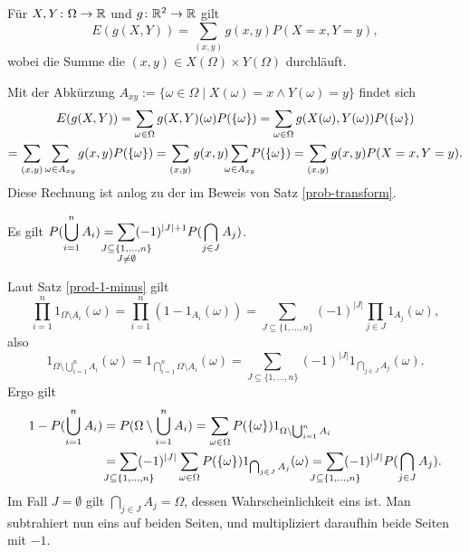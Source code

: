 \begin{Satz}
Für $X,Y\colon\Omega\to\mathbb R$ und $g\colon\mathbb R^2\to\mathbb R$ gilt
\[E(g(X,Y)) = \sum_{(x,y)} g(x,y)P(X=x,Y=y),\]
wobei die Summe die $(x,y)\in X(\Omega)\times Y(\Omega)$ durchläuft.
\end{Satz}
\begin{Beweis}
Mit der Abkürzung $A_{xy}:=\{\omega\in\Omega\mid X(\omega)=x\land Y(\omega)=y\}$
findet sich%
\begin{gather*}
E(g(X,Y)) = \sum_{\omega\in\Omega} g(X,Y)(\omega)P(\{\omega\})
= \sum_{\omega\in\Omega} g(X(\omega),Y(\omega))P(\{\omega\})\\
= \sum_{(x,y)}\sum_{\omega\in A_{xy}} g(x,y)P(\{\omega\})
= \sum_{(x,y)}g(x,y)\sum_{\mathclap{\omega\in A_{xy}}} P(\{\omega\})
= \sum_{(x,y)}g(x,y)P(X=x,Y=y).
\end{gather*}
Diese Rechnung ist anlog zu der im Beweis von Satz \ref{prob-transform}.\,\qedsymbol
\end{Beweis}

\begin{Satz}[Siebformel]\newlinefirst
Es gilt $\displaystyle P(\bigcup_{i=1}^n A_i)
= \sum_{\mathclap{\substack{J\subseteq\{1,\ldots,n\}\\ J\ne\emptyset}}}
(-1)^{|J|+1}P(\bigcap_{j\in J} A_j)$.
\end{Satz}
\begin{Beweis}
Laut Satz \ref{prod-1-minus} gilt
\[\prod_{i=1}^n 1_{\Omega\setminus A_i}(\omega)
= \prod_{i=1}^n (1-1_{A_i}(\omega))
= \sum_{J\subseteq\{1,\ldots,n\}}(-1)^{|J|}\prod_{j\in J}1_{A_j}(\omega),\]
also
\[1_{\Omega\setminus\bigcup_{i=1}^n A_i}(\omega)
= 1_{\bigcap_{i=1}^n\Omega\setminus A_i}(\omega)
= \sum_{J\subseteq\{1,\ldots,n\}}(-1)^{|J|}1_{\bigcap_{j\in J} A_j}(\omega).\]
Ergo gilt
\begin{align*}
1 - P(\bigcup_{i=1}^n A_i) &= P(\Omega\setminus\bigcup_{i=1}^n A_i)
= \sum_{\omega\in\Omega}P(\{\omega\})1_{\Omega\setminus\bigcup_{i=1}^n A_i}\\
&= \sum_{\mathclap{J\subseteq\{1,\ldots,n\}}}(-1)^{|J|}\sum_{\omega\in\Omega}
P(\{\omega\})1_{\bigcap_{j\in J} A_j}(\omega)
= \sum_{\mathclap{J\subseteq\{1,\ldots,n\}}}(-1)^{|J|}P(\bigcap_{j\in J} A_j).
\end{align*}
Im Fall $J=\emptyset$ gilt $\bigcap_{j\in J} A_j = \Omega$, dessen
Wahrscheinlichkeit eins ist. Man subtrahiert nun eins auf beiden
Seiten, und multipliziert daraufhin beide Seiten mit $-1$.\,\qedsymbol
\end{Beweis}

\newpage
